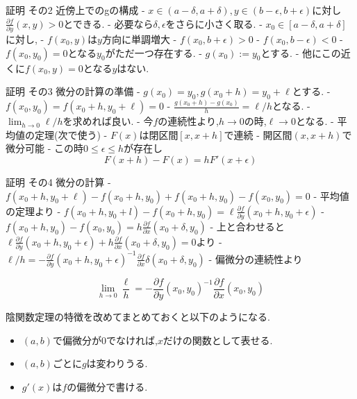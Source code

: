 \documentclass{ujarticle}
\begin{document}
証明 その2 近傍上でのgの構成
- $x \in (a - \delta, a + \delta), y \in (b - \epsilon, b + \epsilon)$に対し$\frac{\partial f}{\partial y}(x, y) > 0$とできる.
  - 必要なら$\delta, \epsilon$をさらに小さく取る.
- $x_0 \in [a - \delta, a + \delta]$に対し,
  - $f(x_0, y)$は$y$方向に単調増大
  - $f(x_0, b + \epsilon) > 0$
  - $f(x_0, b - \epsilon) < 0$
- $f(x_0, y_0) = 0$となる$y_0$がただ一つ存在する.
- $g(x_0):= y_0$とする.
- 他にこの近くに$f(x_0, y) = 0$となる$y$はない.


証明 その3 微分の計算の準備
- $g(x_0) = y_0, g(x_0 + h) = y_0 + \ell$とする.
  - $f(x_0, y_0) = f(x_0 + h, y_0 + \ell) = 0$
- $\frac{g(x_0 + h) - g(x_0)}{h} = \ell / h$となる.
- $\lim_{h \to 0} \ell / h$を求めれば良い.
- 今$f$の連続性より,$h \to 0$の時,$\ell \to 0$となる.
- 平均値の定理(次で使う)
  - $F(x)$は閉区間$[x, x+h]$で連続
  - 開区間$(x, x + h)$で微分可能
  - この時$0 \le \epsilon \le h$が存在し
  $$F(x+h) - F(x) = hF'(x+ \epsilon)$$

証明 その4 微分の計算
- $f(x_0 + h, y_0 + \ell) - f(x_0 + h, y_0) + f(x_0+ h, y_0) - f(x_0, y_0) = 0$
- 平均値の定理より
  - $f(x_0 + h, y_0 + l) - f(x_0 + h, y_0) = \ell \frac{\partial f}{\partial y}(x_0 + h, y_0 + \epsilon)$
  - $f(x_0+ h, y_0) - f(x_0, y_0) = h \frac{\partial f}{\partial x} (x_0 + \delta ,y_0)$
- 上と合わせると$\ell \frac{\partial f}{\partial y}(x_0 + h, y_0 + \epsilon) + h \frac{\partial f}{\partial x }(x_0 + \delta ,y_0) = 0$より
- $\ell / h = - \frac{\partial f}{\partial y}(x_0 + h, y_0 + \epsilon)^{-1} \frac{\partial f}{\partial x}\delta (x_0 + \delta ,y_0)$
- 偏微分の連続性より

  $$\lim_{h \to 0} \frac{\ell}{h} = - \frac{\partial f}{\partial y}(x_0, y_0)^{-1} \frac{\partial f}{\partial x} (x_0, y_0)$$


\begin{rem}
陰関数定理の特徴を改めてまとめておくと以下のようになる.
\begin{itemize}
\item $(a, b)$で偏微分が0でなければ,$x$だけの関数として表せる.
\item $(a, b)$ごとに$g$は変わりうる.
\item $g'(x)$は$f$の偏微分で書ける.
\end{itemize}
\end{rem}
\end{document}

